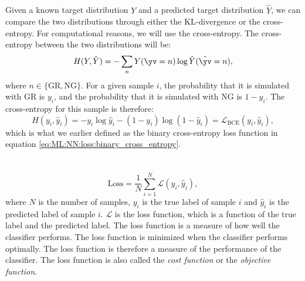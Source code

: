    \subsection{}
        Given a known target distribution $Y$ and a predicted target distribution $\hat{Y}$, we can compare the two distributions through either the KL-divergence or the cross-entropy. For computational reasons, we will use the cross-entropy. The cross-entropy between the two distributions will be:
        \begin{equation}
            H(Y, \hat{Y}) = -\sum_{n} Y(\yv = n) \log \hat{Y}(\hat{\yv}=n),
        \end{equation}
        where $n\in\{\mathrm{GR, NG}\}$. For a given sample $i$, the probability that it is simulated with GR is $y_i$, and the probability that it is simulated with NG is $1-y_i$. The cross-entropy for this sample is therefore:
        \begin{equation}
            H(y_i, \hat{y}_i) = -y_i \log \hat{y}_i - (1-y_i) \log (1-\hat{y}_i) = \mathcal{L}_\mathrm{BCE}(y_i, \hat{y}_i),
        \end{equation}
        which is what we earlier defined as the binary cross-entropy loss function in equation \cref{eq:ML:NN:loss:binary_cross_entropy}.

\section{}
    \subsection{}
        \begin{equation}
            \mathrm{Loss} = \frac{1}{N} \sum_{i=1}^{N} \mathcal{L}(y_i, \hat{y}_i),
        \end{equation}
        where $N$ is the number of samples, $y_i$ is the true label of sample $i$ and $\hat{y}_i$ is the predicted label of sample $i$. $\mathcal{L}$ is the loss function, which is a function of the true label and the predicted label. The loss function is a measure of how well the classifier performs. The loss function is minimized when the classifier performs optimally. The loss function is therefore a measure of the performance of the classifier. The loss function is also called the \textit{cost function} or the \textit{objective function}.
